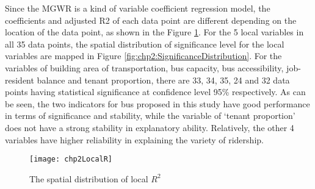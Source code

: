 %
Since the MGWR is a kind of variable coefficient regression model, the coefficients and adjusted R2 of each data point are different depending on the location of the data point, as shown in the Figure \ref{fig:chp2:LocalR}. For the 5 local variables in all 35 data points, the spatial distribution of significance level for the local variables are mapped in Figure \ref{fig:chp2:SignificanceDistribution}. For the variables of building area of transportation, bus capacity, bus accessibility, job-resident balance and tenant proportion, there are 33, 34, 35, 24 and 32 data points having statistical significance at confidence level 95\% respectively. As can be seen, the two indicators for bus proposed in this study have good performance in terms of significance and stability, while the variable of ‘tenant proportion’ does not have a strong stability in explanatory ability. Relatively, the other 4 variables have higher reliability in explaining the variety of ridership.

\begin{figure}[htbp]
	\centering
	\normalsize
	\texttt{[image: chp2LocalR]}
	\caption{The spatial distribution of local $R^2$}
	\label{fig:chp2:LocalR}
\end{figure}


